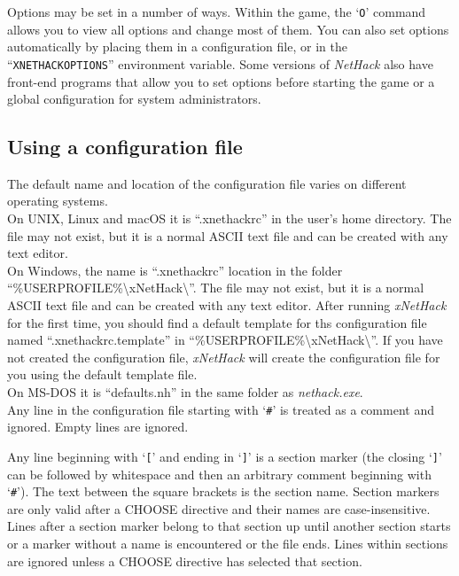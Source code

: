 \documentclass[titlepage]{article}
\begin{document}
Options may be set in a number of ways.  Within the game, the `\texttt{O}'
command allows you to view all options and change most of them.
You can also set options automatically by placing them in a configuration
file, or in the ``\texttt{XNETHACKOPTIONS}'' environment variable.
Some versions of \textit{NetHack} also have front-end programs that allow
you to set options before starting the game or a global configuration
for system administrators.

\subsection*{Using a configuration file}

The default name and location of the configuration file varies on different
operating systems.\\

On UNIX, Linux and macOS it is \mbox{``.xnethackrc''} in the user's home
directory.
The file may not exist, but it is a normal ASCII text file and
can be created with any text editor.\\

On Windows, the name is \mbox{``.xnethackrc''} location in the folder
\mbox{{``\%USERPROFILE\%\textbackslash xNetHack\textbackslash''}}.
The file may not exist,
but it is a normal ASCII text file and can be created with any
text editor.
After running \textit{xNetHack} for the first time, you should find a default
template for ths configuration file named \mbox{``.xnethackrc.template''} in
\mbox{{``\%USERPROFILE\%\textbackslash xNetHack\textbackslash''}}.
If you have not created the configuration file, \textit{xNetHack} will create
the configuration file for you using the default template file.\\

On MS-DOS it is \mbox{``defaults.nh''} in the same folder as
\mbox{\textit{nethack.exe}}.\\

Any line in the configuration file starting with `\texttt{\#}' is treated
as a comment and ignored.
Empty lines are ignored.

Any line beginning with `\texttt{[}' and ending in `\texttt{]}'
is a section marker (the closing `\texttt{]}' can be followed
by whitespace and then an arbitrary comment beginning with `\texttt{\#}').
The text between the square brackets is the section name.
Section markers are only valid after a CHOOSE directive and their names
are case-insensitive.
Lines after a section marker belong to that section up until another
section starts or a marker without a name is encountered or the file ends.
Lines within sections are ignored unless a CHOOSE directive has selected
that section.
\end{document}
